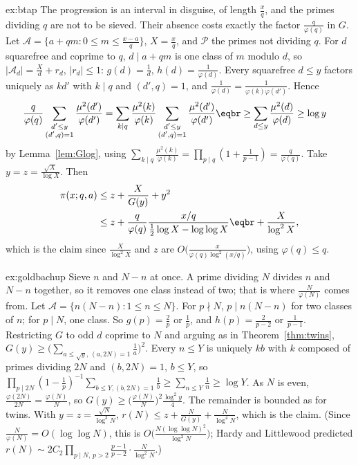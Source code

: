 \begin{solution}{ex:btap}
\idea The progression is an interval in disguise, of length $\frac xq$, and the primes dividing $q$ are not to be sieved. Their absence costs exactly the factor $\frac q{\varphi(q)}$ in $G$.
\writeup Let $\mathcal A=\{a+qm:0\le m\le\frac{x-a}q\}$, $X=\frac xq$, and $\mathcal P$ the primes not dividing $q$. For $d$ squarefree and coprime to $q$, $d\mid a+qm$ is one class of $m$ modulo $d$, so
$|\mathcal A_d|=\frac Xd+r_d$, $|r_d|\le1$: $g(d)=\frac1d$, $h(d)=\frac1{\varphi(d)}$. Every squarefree $d\le y$ factors uniquely as $kd'$ with $k\mid q$ and $(d',q)=1$, and $\frac1{\varphi(d)}=\frac1{\varphi(k)\varphi(d')}$. Hence
\[
\begin{aligned}\frac q{\varphi(q)}\sum_{\substack{d'\le y\\(d',q)=1}}\frac{\mu^2(d')}{\varphi(d')}&=\sum_{k\mid q}\frac{\mu^2(k)}{\varphi(k)}\sum_{\substack{d'\le y\\(d',q)=1}}\frac{\mu^2(d')}{\varphi(d')}\eqbr\ge\sum_{d\le y}\frac{\mu^2(d)}{\varphi(d)}\ge\log y\end{aligned}
\]
by Lemma~\ref{lem:Glog}, using $\sum_{k\mid q}\frac{\mu^2(k)}{\varphi(k)}=\prod_{p\mid q}(1+\frac1{p-1})=\frac q{\varphi(q)}$. Take $y=z=\frac{\sqrt X}{\log X}$. Then
\[
\begin{aligned}\pi(x;q,a)&\le z+\frac{X}{G(y)}+y^2\\&\le z+\frac q{\varphi(q)}\frac{x/q}{\frac12\log X-\log\log X}\eqbr+\frac X{\log^2X},\end{aligned}
\]
which is the claim since $\frac{X}{\log^2X}$ and $z$ are $O\bigl(\frac{x}{\varphi(q)\log^2(x/q)}\bigr)$, using $\varphi(q)\le q$.
\end{solution}

\begin{solution}{ex:goldbachup}
\idea Sieve $n$ and $N-n$ at once. A prime dividing $N$ divides $n$ and $N-n$ together, so it removes one class instead of two; that is where $\frac N{\varphi(N)}$ comes from.
\writeup Let $\mathcal A=\{n(N-n):1\le n\le N\}$. For $p\nmid N$, $p\mid n(N-n)$ for two classes of $n$; for $p\mid N$, one class. So $g(p)=\frac2p$ or $\frac1p$, and $h(p)=\frac2{p-2}$ or $\frac1{p-1}$. Restricting $G$ to odd $d$ coprime to $N$ and arguing as
in Theorem~\ref{thm:twins}, $G(y)\ge\bigl(\sum_{a\le\sqrt y,\,(a,2N)=1}\frac1a\bigr)^2$. Every $n\le Y$ is uniquely $kb$ with $k$ composed of primes dividing $2N$ and $(b,2N)=1$, $b\le Y$, so
$\prod_{p\mid2N}(1-\frac1p)^{-1}\sum_{b\le Y,(b,2N)=1}\frac1b\ge\sum_{n\le Y}\frac1n\ge\log Y$. As $N$ is even, $\frac{\varphi(2N)}{2N}=\frac{\varphi(N)}N$, so $G(y)\ge\bigl(\frac{\varphi(N)}N\bigr)^2\frac{\log^2y}4$. The remainder is bounded as for twins. With
$y=z=\frac{\sqrt N}{\log^3N}$, $r(N)\le z+\frac N{G(y)}+\frac N{\log^4N}$, which is the claim. (Since $\frac N{\varphi(N)}=O(\log\log N)$, this is $O\bigl(\frac{N(\log\log N)^2}{\log^2N}\bigr)$; Hardy and Littlewood predicted $r(N)\sim2C_2\prod_{p\mid N,\,p>2}\frac{p-1}{p-2}\cdot\frac N{\log^2N}$.)
\end{solution}

